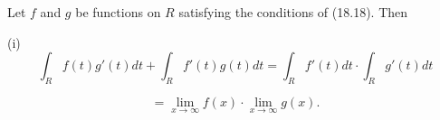 Let $f$ and $g$ be functions on $R$ satisfying the conditions of (18.18). Then

(i) $$\int_R f(t) g'(t) dt + \int_R f'(t) g(t) dt = \int_R f'(t) dt \cdot \int_R g'(t) dt$$

$$= \lim_{x \to \infty} f(x) \cdot \lim_{x \to \infty} g(x).$$